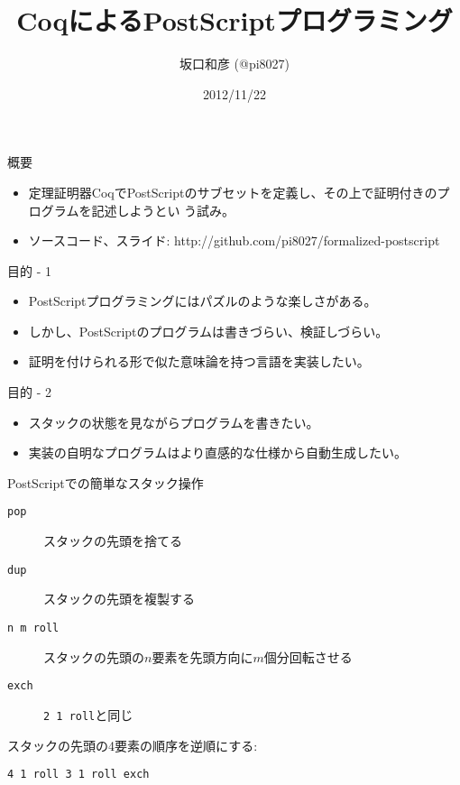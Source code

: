 \documentclass[cjk, 12pt, dvipdfm]{beamer}
\title{CoqによるPostScriptプログラミング}
\author{坂口和彦 (@pi8027)}
\institute{筑波大学 情報学群 情報科学類 B2}
\date{2012/11/22}
\begin{document}
\begin{frame}[plain]

 \maketitle

\end{frame}

\begin{frame}{概要}

 \begin{itemize}
  \item 定理証明器CoqでPostScriptのサブセットを定義し、その上で証明付きのプログラムを記述しようとい
	う試み。
  \item ソースコード、スライド: http://github.com/pi8027/formalized-postscript
 \end{itemize}

\end{frame}

\begin{frame}{目的 - 1}

 \begin{itemize}
  \item PostScriptプログラミングにはパズルのような楽しさがある。
  \item しかし、PostScriptのプログラムは書きづらい、検証しづらい。
  \item 証明を付けられる形で似た意味論を持つ言語を実装したい。
 \end{itemize}

\end{frame}

\begin{frame}{目的 - 2}

 \begin{itemize}
  \item スタックの状態を見ながらプログラムを書きたい。
  \item 実装の自明なプログラムはより直感的な仕様から自動生成したい。
 \end{itemize}

\end{frame}

\begin{frame}[fragile]{PostScriptでの簡単なスタック操作}

 \begin{description}
  \item[\texttt{pop}] スタックの先頭を捨てる
  \item[\texttt{dup}] スタックの先頭を複製する
  \item[\texttt{n m roll}] スタックの先頭の$n$要素を先頭方向に$m$個分回転させる
  \item[\texttt{exch}] \texttt{2 1 roll}と同じ
 \end{description}

 スタックの先頭の4要素の順序を逆順にする:

\begin{lstlisting}[style=postscript]
4 1 roll 3 1 roll exch
\end{lstlisting}

\end{frame}
\end{document}
